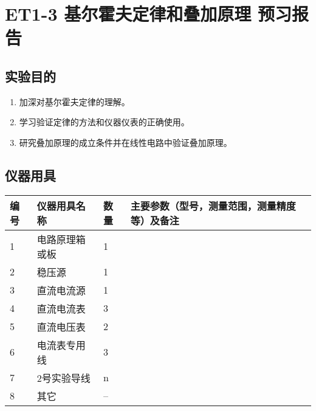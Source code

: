 \documentclass[dvipsnames, svgnames,a4paper,11pt]{article}
\begin{document}
	
	
	\clearpage
	\tableofcontents
	\clearpage
	
	
	
	
	\setcounter{section}{0}
	\section{ET1-3 基尔霍夫定律和叠加原理 \quad\heiti 预习报告}
	
	\subsection{实验目的}
	\begin{enumerate}
		\item 加深对基尔霍夫定律的理解。 
		\item 学习验证定律的方法和仪器仪表的正确使用。 
		\item 研究叠加原理的成立条件并在线性电路中验证叠加原理。
	\end{enumerate}
	
	\subsection{仪器用具}
	\begin{table}[htbp]
		\centering
		\renewcommand\arraystretch{1.6}
		\begin{tabular}{|p{}|p{}|p{}|p{}|}
			\hline
			编号& 仪器用具名称 & 数量 &  主要参数（型号，测量范围，测量精度等）及备注 \\
			\hline
			1& 电路原理箱或板 & 1 &  \\
			\hline
			2& 稳压源 & 1 &  \\
			\hline
			3& 直流电流源 & 1 &  \\
			\hline
			4& 直流电流表 & 3 &  \\
			\hline
			5& 直流电压表 & 2 &  \\
			\hline
			6& 电流表专用线 & 3 &  \\
			\hline
			7& 2号实验导线 & n &  \\
			\hline
			8& 其它 & -- &  \\
			\hline
		\end{tabular}
	\end{table}
	
\end{document}

